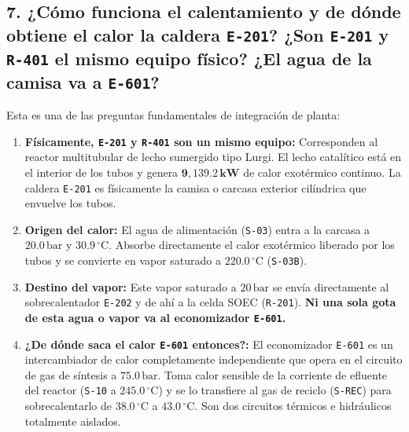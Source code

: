 \documentclass[11pt,a4paper]{article}
\begin{document}
\subsection{7. ¿Cómo funciona el calentamiento y de dónde obtiene el calor la caldera \texttt{E-201}? ¿Son \texttt{E-201} y \texttt{R-401} el mismo equipo físico? ¿El agua de la camisa va a \texttt{E-601}?}
Esta es una de las preguntas fundamentales de integración de planta:
\begin{enumerate}
    \item \textbf{Físicamente, \texttt{E-201} y \texttt{R-401} son un mismo equipo:} Corresponden al reactor multitubular de lecho sumergido tipo Lurgi. El lecho catalítico está en el interior de los tubos y genera $\mathbf{9{,}139.2\,\text{kW}}$ de calor exotérmico continuo. La caldera \texttt{E-201} es físicamente la camisa o carcasa exterior cilíndrica que envuelve los tubos.
    \item \textbf{Origen del calor:} El agua de alimentación (\texttt{S-03}) entra a la carcasa a $20.0\,\text{bar}$ y $30.9\,^\circ\text{C}$. Absorbe directamente el calor exotérmico liberado por los tubos y se convierte en vapor saturado a $220.0\,^\circ\text{C}$ (\texttt{S-03B}).
    \item \textbf{Destino del vapor:} Este vapor saturado a $20\,\text{bar}$ se envía directamente al sobrecalentador \texttt{E-202} y de ahí a la celda SOEC (\texttt{R-201}). \textbf{Ni una sola gota de esta agua o vapor va al economizador \texttt{E-601}.}
    \item \textbf{¿De dónde saca el calor \texttt{E-601} entonces?:} El economizador \texttt{E-601} es un intercambiador de calor completamente independiente que opera en el circuito de gas de síntesis a $75.0\,\text{bar}$. Toma calor sensible de la corriente de efluente del reactor (\texttt{S-10} a $245.0\,^\circ\text{C}$) y se lo transfiere al gas de reciclo (\texttt{S-REC}) para sobrecalentarlo de $38.0\,^\circ\text{C}$ a $43.0\,^\circ\text{C}$. Son dos circuitos térmicos e hidráulicos totalmente aislados.
\end{enumerate}
\end{document}
